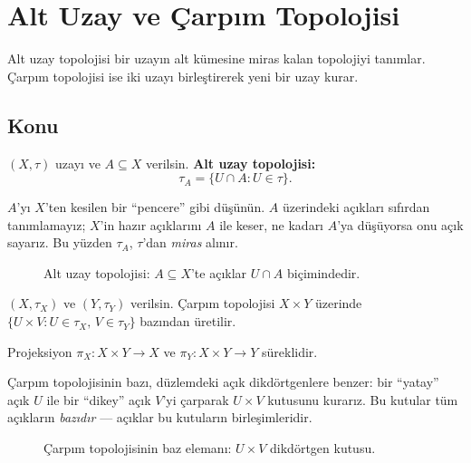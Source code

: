\chapter{Alt Uzay ve Çarpım Topolojisi}

Alt uzay topolojisi bir uzayın alt kümesine miras kalan topolojiyi tanımlar.
Çarpım topolojisi ise iki uzayı birleştirerek yeni bir uzay kurar.

\section{Konu}

\begin{definition}
$(X, \tau)$ uzayı ve $A \subseteq X$ verilsin. \textbf{Alt uzay topolojisi:}
\[
\tau_A = \{U \cap A : U \in \tau\}.
\]
\end{definition}

\begin{sezgi}
$A$'yı $X$'ten kesilen bir ``pencere'' gibi düşünün. $A$ üzerindeki açıkları
sıfırdan tanımlamayız; $X$'in hazır açıklarını $A$ ile keser, ne kadarı $A$'ya
düşüyorsa onu açık sayarız. Bu yüzden $\tau_A$, $\tau$'dan \emph{miras} alınır.
\end{sezgi}

\begin{figure}[ht]
\centering

\caption{Alt uzay topolojisi: $A \subseteq X$'te açıklar $U \cap A$ biçimindedir.}
\end{figure}

\begin{definition}
$(X, \tau_X)$ ve $(Y, \tau_Y)$ verilsin. Çarpım topolojisi $X \times Y$ üzerinde
$\{U \times V : U \in \tau_X,\, V \in \tau_Y\}$ bazından üretilir.
\end{definition}

Projeksiyon $\pi_X: X \times Y \to X$ ve $\pi_Y: X \times Y \to Y$ süreklidir.

\begin{sezgi}
Çarpım topolojisinin bazı, düzlemdeki açık dikdörtgenlere benzer: bir ``yatay''
açık $U$ ile bir ``dikey'' açık $V$'yi çarparak $U \times V$ kutusunu kurarız.
Bu kutular tüm açıkların \emph{bazıdır} --- açıklar bu kutuların birleşimleridir.
\end{sezgi}

\begin{figure}[ht]
\centering

\caption{Çarpım topolojisinin baz elemanı: $U \times V$ dikdörtgen kutusu.}
\end{figure}

